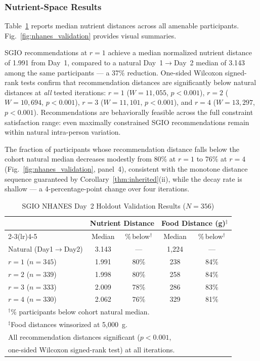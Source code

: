 \documentclass[journal]{IEEEtran}
\begin{document}
\subsubsection{Nutrient-Space Results}

Table~\ref{tab:nhanes_results} reports median nutrient distances across
all amenable participants. Fig.~\ref{fig:nhanes_validation} provides
visual summaries.

SGIO recommendations at $r{=}1$ achieve a median normalized nutrient
distance of 1.991 from Day~1, compared to a natural Day~1$\to$Day~2
median of 3.143 among the same participants --- a 37\% reduction.
One-sided Wilcoxon signed-rank tests confirm that recommendation
distances are significantly below natural distances at \emph{all} tested
iterations: $r{=}1$ ($W{=}11{,}055$, $p{<}0.001$), $r{=}2$
($W{=}10{,}694$, $p{<}0.001$), $r{=}3$ ($W{=}11{,}101$,
$p{<}0.001$), and $r{=}4$ ($W{=}13{,}297$, $p{<}0.001$).
Recommendations are behaviorally feasible across the full constraint
satisfaction range: even maximally constrained SGIO recommendations
remain within natural intra-person variation.

The fraction of participants whose recommendation distance falls below
the cohort natural median decreases modestly from 80\% at $r{=}1$ to
76\% at $r{=}4$
(Fig.~\ref{fig:nhanes_validation}, panel~4), consistent with the
monotone distance sequence guaranteed by Corollary~\ref{thm:inherited}(ii),
while the decay rate is shallow --- a 4-percentage-point change over
four iterations.

\begin{table}[t]
\caption{SGIO NHANES Day~2 Holdout Validation Results ($N{=}356$)}
\label{tab:nhanes_results}
\begin{center}
\begin{tabular}{lcccc}
\toprule
 & \multicolumn{2}{c}{\textbf{Nutrient Distance}}
 & \multicolumn{2}{c}{\textbf{Food Distance (g)}$^{\ddagger}$} \\
\cmidrule(lr){2-3}\cmidrule(lr){4-5}
 & Median & \%\,below$^{\dagger}$ & Median & \%\,below$^{\dagger}$ \\
\midrule
Natural (Day1$\to$Day2) & 3.143 & --- & 1,224 & --- \\
\midrule
$r{=}1$ ($n{=}345$) & 1.991 & 80\% & 238 & 84\% \\
$r{=}2$ ($n{=}339$) & 1.998 & 80\% & 258 & 84\% \\
$r{=}3$ ($n{=}333$) & 2.009 & 78\% & 286 & 83\% \\
$r{=}4$ ($n{=}330$) & 2.062 & 76\% & 329 & 81\% \\
\bottomrule
\multicolumn{5}{l}{%
  \footnotesize $^{\dagger}$\% participants below cohort natural median.}\\
\multicolumn{5}{l}{%
  \footnotesize $^{\ddagger}$Food distances winsorized at 5,000~g.}\\
\multicolumn{5}{l}{%
  \footnotesize All recommendation distances significant ($p{<}0.001$,}\\
\multicolumn{5}{l}{%
  \footnotesize one-sided Wilcoxon signed-rank test) at all iterations.}
\end{tabular}
\end{center}
\end{table}
\end{document}
